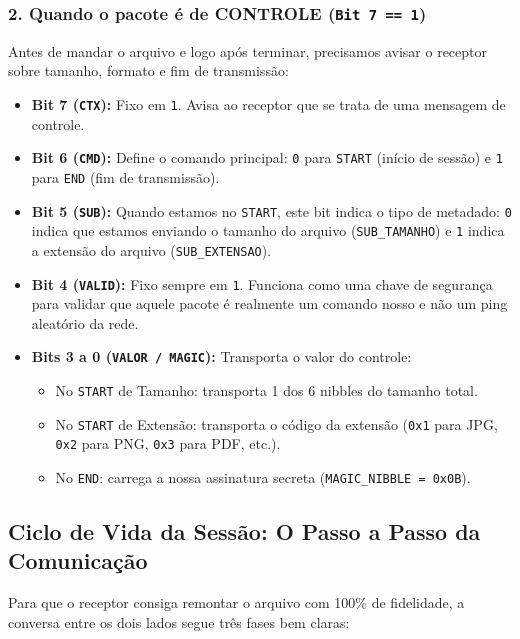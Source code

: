 \documentclass[12pt,a4paper]{article}
\begin{document}
\subsubsection{2. Quando o pacote é de CONTROLE (\texttt{Bit 7 == 1})}
Antes de mandar o arquivo e logo após terminar, precisamos avisar o receptor sobre tamanho, formato e fim de transmissão:
\begin{itemize}[leftmargin=*]
    \item \textbf{Bit 7 (\texttt{CTX}):} Fixo em \texttt{1}. Avisa ao receptor que se trata de uma mensagem de controle.
    \item \textbf{Bit 6 (\texttt{CMD}):} Define o comando principal: \texttt{0} para \texttt{START} (início de sessão) e \texttt{1} para \texttt{END} (fim de transmissão).
    \item \textbf{Bit 5 (\texttt{SUB}):} Quando estamos no \texttt{START}, este bit indica o tipo de metadado: \texttt{0} indica que estamos enviando o tamanho do arquivo (\texttt{SUB\_TAMANHO}) e \texttt{1} indica a extensão do arquivo (\texttt{SUB\_EXTENSAO}).
    \item \textbf{Bit 4 (\texttt{VALID}):} Fixo sempre em \texttt{1}. Funciona como uma chave de segurança para validar que aquele pacote é realmente um comando nosso e não um ping aleatório da rede.
    \item \textbf{Bits 3 a 0 (\texttt{VALOR / MAGIC}):} Transporta o valor do controle:
    \begin{itemize}
        \item No \texttt{START} de Tamanho: transporta 1 dos 6 nibbles do tamanho total.
        \item No \texttt{START} de Extensão: transporta o código da extensão (\texttt{0x1} para JPG, \texttt{0x2} para PNG, \texttt{0x3} para PDF, etc.).
        \item No \texttt{END}: carrega a nossa assinatura secreta (\texttt{MAGIC\_NIBBLE = 0x0B}).
    \end{itemize}
\end{itemize}

\subsection{Ciclo de Vida da Sessão: O Passo a Passo da Comunicação}
Para que o receptor consiga remontar o arquivo com 100\% de fidelidade, a conversa entre os dois lados segue três fases bem claras:
\end{document}
